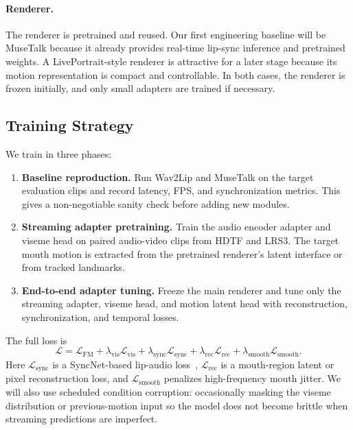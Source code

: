 \documentclass{article}
\begin{document}
\paragraph{Renderer.}
The renderer is pretrained and reused. Our first engineering baseline will be MuseTalk because it already provides real-time lip-sync inference and pretrained weights. A LivePortrait-style renderer is attractive for a later stage because its motion representation is compact and controllable. In both cases, the renderer is frozen initially, and only small adapters are trained if necessary.

\subsection{Training Strategy}

We train in three phases:
\begin{enumerate}
    \item \textbf{Baseline reproduction.} Run Wav2Lip and MuseTalk on the target evaluation clips and record latency, FPS, and synchronization metrics. This gives a non-negotiable sanity check before adding new modules.
    \item \textbf{Streaming adapter pretraining.} Train the audio encoder adapter and viseme head on paired audio-video clips from HDTF and LRS3. The target mouth motion is extracted from the pretrained renderer's latent interface or from tracked landmarks.
    \item \textbf{End-to-end adapter tuning.} Freeze the main renderer and tune only the streaming adapter, viseme head, and motion latent head with reconstruction, synchronization, and temporal losses.
\end{enumerate}

The full loss is
\begin{equation}
    \mathcal{L}
    =
    \mathcal{L}_{\text{FM}}
    + \lambda_{\text{vis}}\mathcal{L}_{\text{vis}}
    + \lambda_{\text{sync}}\mathcal{L}_{\text{sync}}
    + \lambda_{\text{rec}}\mathcal{L}_{\text{rec}}
    + \lambda_{\text{smooth}}\mathcal{L}_{\text{smooth}}.
\end{equation}
Here $\mathcal{L}_{\text{sync}}$ is a SyncNet-based lip-audio loss~\cite{syncnet,wav2lip}, $\mathcal{L}_{\text{rec}}$ is a mouth-region latent or pixel reconstruction loss, and $\mathcal{L}_{\text{smooth}}$ penalizes high-frequency mouth jitter. We will also use scheduled condition corruption: occasionally masking the viseme distribution or previous-motion input so the model does not become brittle when streaming predictions are imperfect.
\end{document}
